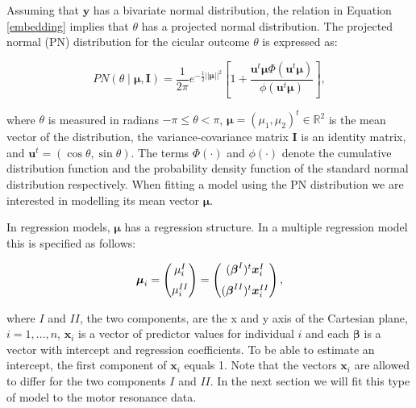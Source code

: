 \documentclass[11pt,]{article}
\begin{document}
Assuming that \(\boldsymbol{y}\) has a bivariate normal distribution,
the relation in Equation \ref{embedding} implies that \(\theta\) has a
projected normal distribution. The projected normal (PN) distribution
for the cicular outcome \(\theta\) is expressed as:

\begin{equation}\label{PN} PN(\theta \mid \boldsymbol{\mu}, \boldsymbol{I})  =
\frac{1}{2 \pi} e^{-\frac{1}{2}\vert \vert \boldsymbol\mu \vert \vert ^ 2}
\left[1+\frac{\boldsymbol{u}^t\boldsymbol\mu\Phi(\boldsymbol{u}^t\boldsymbol\mu)}{\phi(\boldsymbol{u}^t\boldsymbol\mu)}\right],
\end{equation}

where \(\theta\) is measured in radians \(-\pi \leq \theta < \pi\),
\(\boldsymbol{\mu} = (\mu_{1}, \mu_{2})^{t} \in \mathbb{R}^2\) is the
mean vector of the distribution, the variance-covariance matrix
\(\boldsymbol{I}\) is an identity matrix, and
\(\boldsymbol{u}^{t} = (\cos \theta, \sin \theta)\). The terms
\(\Phi(\cdot)\) and \(\phi(\cdot)\) denote the cumulative distribution
function and the probability density function of the standard normal
distribution respectively. When fitting a model using the PN
distribution we are interested in modelling its mean vector
\(\boldsymbol{\mu}\).

In regression models, \(\boldsymbol{\mu}\) has a regression structure.
In a multiple regression model this is specified as follows:

\begin{equation}\label{regression}
\boldsymbol{\mu}_{i} = \begin{pmatrix}
  \mu_{i}^{I}  \vspace{0.2cm}  \\
\mu_{i}^{II}
 \end{pmatrix}=\begin{pmatrix}
  (\boldsymbol{\beta}^{I})^{t}\boldsymbol{x}_{i}^{I} \vspace{0.2cm}  \\
  (\boldsymbol{\beta}^{II})^{t}\boldsymbol{x}_{i}^{II} 
 \end{pmatrix},
\end{equation}

where \(I\) and \(II\), the two components, are the x and y axis of the
Cartesian plane, \(i = 1, \dots, n\), \(\boldsymbol{x}_{i}\) is a vector
of predictor values for individual \(i\) and each \(\boldsymbol{\beta}\)
is a vector with intercept and regression coefficients. To be able to
estimate an intercept, the first component of \(\boldsymbol{x}_{i}\)
equals 1. Note that the vectors \(\boldsymbol{x}_{i}\) are allowed to
differ for the two components \(I\) and \(II\). In the next section we
will fit this type of model to the motor resonance data.
\end{document}
